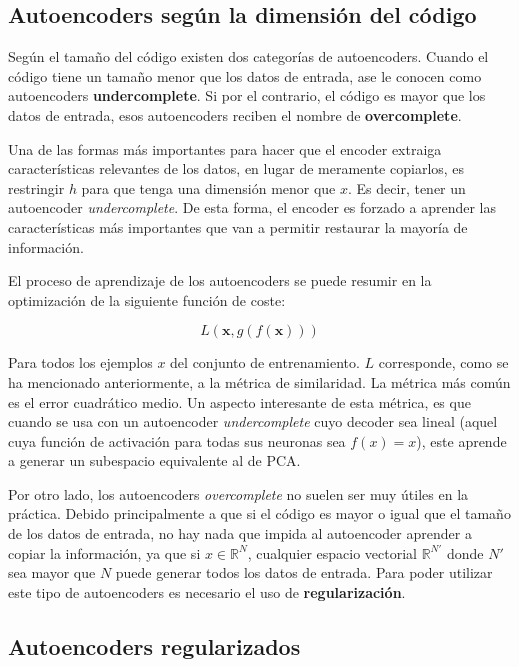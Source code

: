 \documentclass[
  12pt,
  a4paperpaper,
]{report}
\begin{document}
\hypertarget{autoencoders-seguxfan-la-dimensiuxf3n-del-cuxf3digo}{%
\subsection{Autoencoders según la dimensión del
código}\label{autoencoders-seguxfan-la-dimensiuxf3n-del-cuxf3digo}}

Según el tamaño del código existen dos categorías de autoencoders.
Cuando el código tiene un tamaño menor que los datos de entrada, ase le
conocen como autoencoders \textbf{undercomplete}. Si por el contrario,
el código es mayor que los datos de entrada, esos autoencoders reciben
el nombre de \textbf{overcomplete}.

Una de las formas más importantes para hacer que el encoder extraiga
características relevantes de los datos, en lugar de meramente
copiarlos, es restringir \(h\) para que tenga una dimensión menor que
\(x\). Es decir, tener un autoencoder \emph{undercomplete}. De esta
forma, el encoder es forzado a aprender las características más
importantes que van a permitir restaurar la mayoría de información.

El proceso de aprendizaje de los autoencoders se puede resumir en la
optimización de la siguiente función de coste:

\[L(\boldsymbol{x}, g(f(\boldsymbol{x})))\]

Para todos los ejemplos \(x\) del conjunto de entrenamiento. \(L\)
corresponde, como se ha mencionado anteriormente, a la métrica de
similaridad. La métrica más común es el error cuadrático medio. Un
aspecto interesante de esta métrica, es que cuando se usa con un
autoencoder \emph{undercomplete} cuyo decoder sea lineal (aquel cuya
función de activación para todas sus neuronas sea \(f(x) = x\)), este
aprende a generar un subespacio equivalente al de PCA.

Por otro lado, los autoencoders \emph{overcomplete} no suelen ser muy
útiles en la práctica. Debido principalmente a que si el código es mayor
o igual que el tamaño de los datos de entrada, no hay nada que impida al
autoencoder aprender a copiar la información, ya que si
\(x \in \mathbb{R}^N\), cualquier espacio vectorial \(\mathbb{R}^{N'}\)
donde \(N'\) sea mayor que \(N\) puede generar todos los datos de
entrada. Para poder utilizar este tipo de autoencoders es necesario el
uso de \textbf{regularización}.

\hypertarget{autoencoders-regularizados}{%
\subsection{Autoencoders
regularizados}\label{autoencoders-regularizados}}
\end{document}
